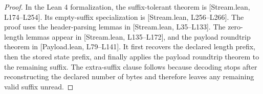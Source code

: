 \documentclass[10pt,a4paper]{amsart}
\newcommand{\LeanPayload}[2]{\href{https://github.com/KyrylR/phd-symmetric-cryptography/blob/8e903222a7df1c4365592e4b16fa752a924b8977/lean/encoding-dr-1/EncodingProofs/BaseMLen/Payload.lean\#L#1-L#2}{[Payload.lean, L#1--L#2]}}
\newcommand{\LeanStream}[2]{\href{https://github.com/KyrylR/phd-symmetric-cryptography/blob/8e903222a7df1c4365592e4b16fa752a924b8977/lean/encoding-dr-1/EncodingProofs/BaseMLen/Stream.lean\#L#1-L#2}{[Stream.lean, L#1--L#2]}}
\providecommand{\href}[2]{#2}
\begin{document}
    \begin{proof}
        In the Lean 4 formalization, the suffix-tolerant theorem is \LeanStream{174}{254}.
        Its empty-suffix specialization is \LeanStream{256}{266}.
        The proof uses the header-parsing lemmas in \LeanStream{35}{133}.
        The zero-length lemmas appear in \LeanStream{135}{172}, and the payload roundtrip theorem in
        \LeanPayload{79}{141}.
        It first recovers the declared length prefix, then the stored state prefix, and finally applies the
        payload roundtrip theorem to the remaining suffix.
        The extra-suffix clause follows because decoding stops after reconstructing the declared number
        of bytes and therefore leaves any remaining valid suffix unread.
    \end{proof}
\end{document}
